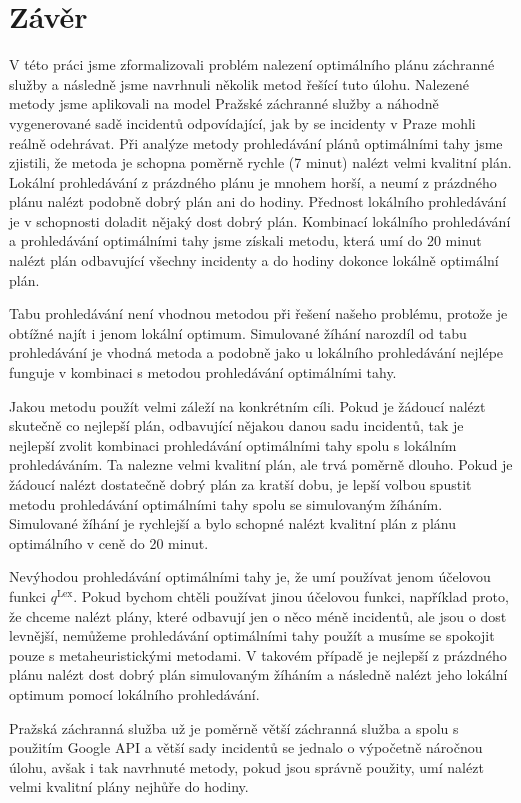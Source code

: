 \chapter*{Závěr}

V této práci jsme zformalizovali problém nalezení optimálního plánu záchranné služby a následně jsme navrhnuli několik metod řešící tuto úlohu.
Nalezené metody jsme aplikovali na model Pražské záchranné služby a náhodně vygenerované sadě incidentů odpovídající, jak by se incidenty v Praze mohli reálně odehrávat.
Při analýze metody prohledávání plánů optimálními tahy jsme zjistili, že metoda je schopna poměrně rychle (7 minut) nalézt velmi kvalitní plán.
Lokální prohledávání z prázdného plánu je mnohem horší, a neumí z prázdného plánu nalézt podobně dobrý plán ani do hodiny.
Přednost lokálního prohledávání je v schopnosti doladit nějaký dost dobrý plán.
Kombinací lokálního prohledávání a prohledávání optimálními tahy jsme získali metodu,
která umí do 20 minut nalézt plán odbavující všechny incidenty a do hodiny dokonce lokálně optimální plán.

Tabu prohledávání není vhodnou metodou při řešení našeho problému, protože je obtížné najít i jenom lokální optimum.
Simulované žíhání narozdíl od tabu prohledávání je vhodná metoda a podobně jako u lokálního prohledávání nejlépe funguje v kombinaci s metodou prohledávání optimálními tahy. 

Jakou metodu použít velmi záleží na konkrétním cíli.
Pokud je žádoucí nalézt skutečně co nejlepší plán, odbavující nějakou danou sadu incidentů, tak je nejlepší zvolit kombinaci prohledávání optimálními tahy spolu s lokálním prohledáváním.
Ta nalezne velmi kvalitní plán, ale trvá poměrně dlouho.
Pokud je žádoucí nalézt dostatečně dobrý plán za kratší dobu, je lepší volbou spustit metodu prohledávání optimálními tahy spolu se simulovaným žíháním.
Simulované žíhání je rychlejší a bylo schopné nalézt kvalitní plán z plánu optimálního v ceně do 20 minut.

Nevýhodou prohledávání optimálními tahy je, že umí používat jenom účelovou funkci $q^{\text{Lex}}$.
Pokud bychom chtěli používat jinou účelovou funkci, například proto, že chceme nalézt plány, které odbavují jen o něco méně incidentů, ale jsou o dost levnější,
nemůžeme prohledávání optimálními tahy použít a musíme se spokojit pouze s metaheuristickými metodami.
V takovém případě je nejlepší z prázdného plánu nalézt dost dobrý plán simulovaným žíháním a následně nalézt jeho lokální optimum pomocí lokálního prohledávání.

Pražská záchranná služba už je poměrně větší záchranná služba a spolu s použitím Google API a větší sady incidentů se jednalo o výpočetně náročnou úlohu, avšak i tak
navrhnuté metody, pokud jsou správně použity, umí nalézt velmi kvalitní plány nejhůře do hodiny.

